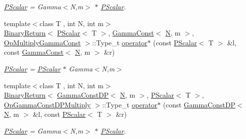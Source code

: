 \begin{DoxyCompactItemize}
\begin{DoxyCompactList}\small\item\em \mbox{\hyperlink{classENSEM_1_1PScalar}{P\+Scalar}} = Gamma$<$\+N,m$>$ $\ast$ \mbox{\hyperlink{classENSEM_1_1PScalar}{P\+Scalar}}. \end{DoxyCompactList}\item 
{\footnotesize template$<$class T , int N, int m$>$ }\\\mbox{\hyperlink{structENSEM_1_1BinaryReturn}{Binary\+Return}}$<$ \mbox{\hyperlink{classENSEM_1_1PScalar}{P\+Scalar}}$<$ T $>$, \mbox{\hyperlink{classENSEM_1_1GammaConst}{Gamma\+Const}}$<$ \mbox{\hyperlink{operator__name__util_8cc_a7722c8ecbb62d99aee7ce68b1752f337}{N}}, m $>$, \mbox{\hyperlink{structENSEM_1_1OpMultiplyGammaConst}{Op\+Multiply\+Gamma\+Const}} $>$\+::Type\+\_\+t \mbox{\hyperlink{group__primscalar_ga1f975f2be8a25d77d5b101c1db566a23}{operator$\ast$}} (const \mbox{\hyperlink{classENSEM_1_1PScalar}{P\+Scalar}}$<$ T $>$ \&l, const \mbox{\hyperlink{classENSEM_1_1GammaConst}{Gamma\+Const}}$<$ \mbox{\hyperlink{operator__name__util_8cc_a7722c8ecbb62d99aee7ce68b1752f337}{N}}, m $>$ \&r)
\begin{DoxyCompactList}\small\item\em \mbox{\hyperlink{classENSEM_1_1PScalar}{P\+Scalar}} = \mbox{\hyperlink{classENSEM_1_1PScalar}{P\+Scalar}} $\ast$ Gamma$<$\+N,m$>$ \end{DoxyCompactList}\item 
{\footnotesize template$<$class T , int N, int m$>$ }\\\mbox{\hyperlink{structENSEM_1_1BinaryReturn}{Binary\+Return}}$<$ \mbox{\hyperlink{classENSEM_1_1GammaConstDP}{Gamma\+Const\+DP}}$<$ \mbox{\hyperlink{operator__name__util_8cc_a7722c8ecbb62d99aee7ce68b1752f337}{N}}, m $>$, \mbox{\hyperlink{classENSEM_1_1PScalar}{P\+Scalar}}$<$ T $>$, \mbox{\hyperlink{structENSEM_1_1OpGammaConstDPMultiply}{Op\+Gamma\+Const\+D\+P\+Multiply}} $>$\+::Type\+\_\+t \mbox{\hyperlink{group__primscalar_gab3054a5c0ba0653b3b4069e2449e20ab}{operator$\ast$}} (const \mbox{\hyperlink{classENSEM_1_1GammaConstDP}{Gamma\+Const\+DP}}$<$ \mbox{\hyperlink{operator__name__util_8cc_a7722c8ecbb62d99aee7ce68b1752f337}{N}}, m $>$ \&l, const \mbox{\hyperlink{classENSEM_1_1PScalar}{P\+Scalar}}$<$ T $>$ \&r)
\begin{DoxyCompactList}\small\item\em \mbox{\hyperlink{classENSEM_1_1PScalar}{P\+Scalar}} = Gamma$<$\+N,m$>$ $\ast$ \mbox{\hyperlink{classENSEM_1_1PScalar}{P\+Scalar}}. \end{DoxyCompactList}\item 

\end{DoxyCompactItemize}
